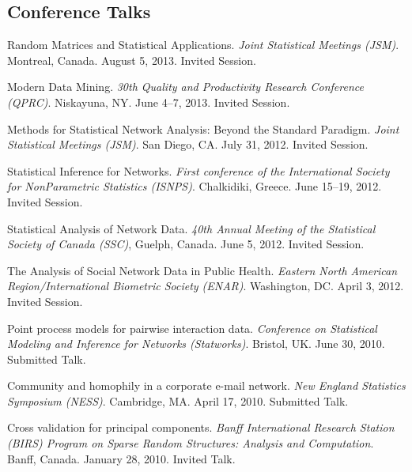 \documentclass[10pt,letterpaper]{article}
\renewenvironment{itemize}{
  \begin{list}{}{
    \setlength{\leftmargin}{1.5em}
    \setlength{\itemsep}{0.25em}
    \setlength{\parskip}{0pt}
    \setlength{\parsep}{0.25em}
  }
}{
  \end{list}
}
\begin{document}
\subsection*{Conference Talks}
\begin{itemize}
\item Random Matrices and Statistical Applications.
  \textit{Joint Statistical Meetings (JSM)}.
  Montreal, Canada.
  August 5, 2013.
  Invited Session.

\item Modern Data Mining.
  \textit{30th Quality and Productivity Research Conference (QPRC)}.
  Niskayuna, NY.
  June 4--7, 2013.
  Invited Session.

\item Methods for Statistical Network Analysis: Beyond the Standard Paradigm.
  \textit{Joint Statistical Meetings (JSM)}.
  San Diego, CA.
  July 31, 2012.
  Invited Session.

\item Statistical Inference for Networks. 
  \textit{First conference of the International Society for NonParametric Statistics (ISNPS)}.
  Chalkidiki, Greece.
  June 15--19, 2012.
  Invited Session.

\item Statistical Analysis of Network Data.
  \textit{40th Annual Meeting of the Statistical Society of Canada (SSC)},
  Guelph, Canada.
  June 5, 2012.
  Invited Session.

\item The Analysis of Social Network Data in Public Health.
  \textit{Eastern North American Region/International Biometric Society (ENAR)}.
  Washington, DC.
  April 3, 2012.
  Invited Session.

\item Point process models for pairwise interaction data.
  \textit{Conference on Statistical Modeling and Inference for Networks (Statworks)}.
  Bristol, UK.
  June 30, 2010.
  Submitted Talk.

\item Community and homophily in a corporate e-mail network.
  \textit{New England Statistics Symposium (NESS)}.
  Cambridge, MA.
  April 17, 2010.
  Submitted Talk.

\item Cross validation for principal components.
  \textit{Banff International Research Station (BIRS) Program on Sparse Random Structures: Analysis and Computation}.
  Banff, Canada.
  January 28, 2010.
  Invited Talk.
\end{itemize}
\end{document}
